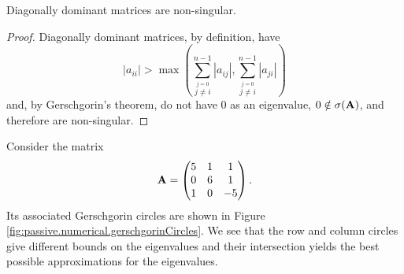 \begin{corr}\label{corr:passive.numerical.diagDominantMatrices}
 Diagonally dominant matrices are non-singular.
\end{corr}

 \begin{proof}
  Diagonally dominant matrices, by definition, have 
    \begin{equation}
     |a_{ii}| > \max\left(\sum_{\stackrel{j=0}{j\neq i}}^{n-1} |a_{ij}|, \sum_{\stackrel{j=0}{j\neq i}}^{n-1} |a_{ji}|\right)
    \end{equation}
  and, by Gerschgorin's theorem, do not have 0 as an eigenvalue, $0\notin\sigma(\mathbf{A})$, and therefore are 
  non-singular.
 \end{proof}

\begin{exmp}
  Consider the matrix \cite[p.~499]{MEY2001}
  \begin{equation}
    \label{eq:passive.numerical.exampleMatrixGerschgorin}
    \mathbf{A} = \begin{pmatrix} 5 & 1 & 1 \\ 0 & 6 & 1 \\ 1 & 0 & -5 \end{pmatrix}.
  \end{equation}
  Its associated Gerschgorin circles are shown in Figure \ref{fig:passive.numerical.gerschgorinCircles}. 
  We see that the row and column circles give different bounds on the eigenvalues and their intersection 
  yields the best possible approximations for the eigenvalues. 
\end{exmp}

